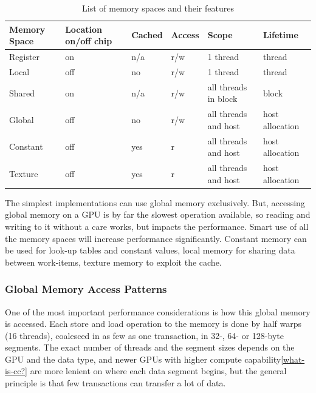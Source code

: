 \begin{table}
  \begin{tabular}{|l|l|l|l|l|l|}
    \hline
    Memory Space & Location on/off chip & Cached & Access & Scope                & Lifetime        \\ \hline
    Register     & on                   & n/a    & r/w    & 1 thread             & thread          \\
    Local        & off                  & no     & r/w    & 1 thread             & thread          \\
    Shared       & on                   & n/a    & r/w    & all threads in block & block           \\
    Global       & off                  & no     & r/w    & all threads and host & host allocation \\
    Constant     & off                  & yes    & r      & all threads and host & host allocation \\
    Texture      & off                  & yes    & r      & all threads and host & host allocation \\
    \hline
  \end{tabular}
  \label{table:memory-properties}
  \caption{List of memory spaces and their features}
\end{table}

The simplest implementations can use global memory exclusively. But,
accessing global memory on a GPU is by far the slowest operation
available, so reading and writing to it without a care works, but
impacts the performance. Smart use of all the memory spaces will
increase performance significantly. Constant memory can be used for
look-up tables and constant values, local memory for sharing data
between work-items, texture memory to exploit the cache.

\subsubsection{Global Memory Access Patterns}
\label{sect:global-memory-optimization}
One of the most important performance considerations is how this
global memory is accessed. Each store and load operation to the memory
is done by half warps (16 threads), coalesced in as few as one
transaction, in 32-, 64- or 128-byte segments. The exact number of
threads and the segment sizes depends on the GPU and the data type,
and newer GPUs with higher compute capability\ref{what-is-cc?} are
more lenient on where each data segment begins, but the general
principle is that few transactions can transfer a lot of data.

